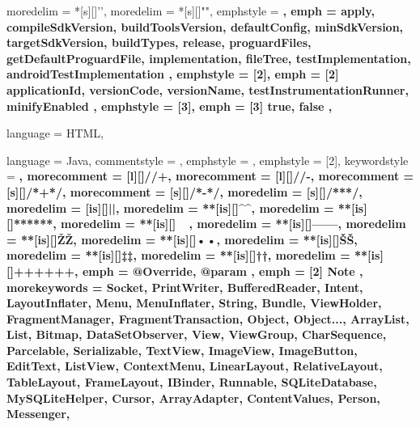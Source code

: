  {
	moredelim = *[s][\color{gray}]{'}{'},
	moredelim = *[s][\color{ForestGreen}]{"}{"},
	emphstyle = \bfseries,
	emph = {
		apply,
		compileSdkVersion,
		buildToolsVersion,
		defaultConfig,
		minSdkVersion,
		targetSdkVersion,
		buildTypes,
		release,
		proguardFiles,
		getDefaultProguardFile,
		implementation,
		fileTree, testImplementation,
		androidTestImplementation
	},
	emphstyle = {[2]\bfseries\color{violet}},
	emph = {[2]
		applicationId,
		versionCode,
		versionName,
		testInstrumentationRunner,
		minifyEnabled
	},
	emphstyle = {[3]\bfseries\color{orange}},
	emph = {[3]
		true,
		false
	},
}

 {
	language = HTML,
}

 {
	language = Java,
	commentstyle = \color{ashgrey},
	emphstyle = {\color{darkgray}},
	emphstyle = {[2]\bfseries},
	keywordstyle = \color{black}\bfseries,
	morecomment = [l][\color{blue}]{//+},		%
	morecomment = [l][\color{red}]{//-},		%
	morecomment = [s][\color{blue}]{/*+}{*/},	%
	morecomment = [s][\color{red}]{/*-}{*/},	%
	moredelim = [s][\color{ashgrey}]{/**}{*/},		%
	moredelim = [is][\soutthick]{|}{|},						%
	moredelim = **[is][\color{blue}]{^}{^},					%
	moredelim = **[is][\color{ForestGreen}]{***}{***},		%
	moredelim = **[is][\color{red}]{~}{~},					%
	moredelim = **[is][\btHL]{---}{---},					%
	moredelim = **[is][{\btHL[fill=blue!60]}]{Ž}{Ž},		%
	moredelim = **[is][{\btHL[fill=SkyBlue]}]{•}{•},		%
	moredelim = **[is][{\btHL[fill=orange!60]}]{Š}{Š},		%
	moredelim = **[is][{\btHL[fill=yellow!60]}]{‡}{‡},		%
	moredelim = **[is][{\btHL[fill=ForestGreen]}]{†}{†},	%
	moredelim = **[is][{\btHL[fill=green!30]}]{+++}{+++},	%
	emph = {
		@Override,
		@param
	},
	emph = {[2]
		Note
	},
	morekeywords = {
		Socket, PrintWriter, BufferedReader,
		Intent, LayoutInflater, Menu, MenuInflater, String, Bundle, ViewHolder,
		FragmentManager, FragmentTransaction,
		Object, Object...,
		ArrayList, List, Bitmap, DataSetObserver,
		View, ViewGroup,
		CharSequence, Parcelable, Serializable,
		TextView, ImageView,
		ImageButton, EditText, ListView, ContextMenu,
		LinearLayout, RelativeLayout, TableLayout, FrameLayout,
		IBinder, Runnable,
		SQLiteDatabase, MySQLiteHelper, Cursor, ArrayAdapter, ContentValues,
		Person, Messenger,
	}
}

